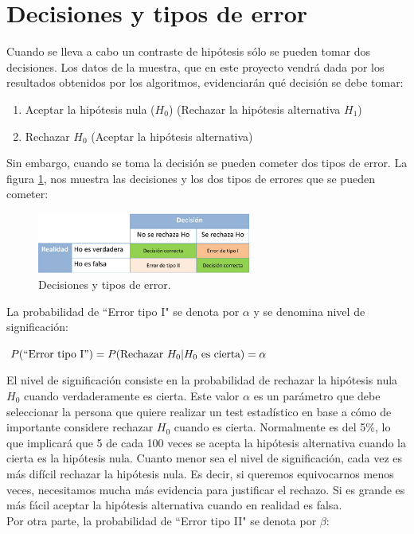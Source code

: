 \section{Decisiones y tipos de error} \label{tipos_error}
Cuando se lleva a cabo un contraste de hipótesis sólo se pueden tomar dos decisiones. Los datos de la muestra,
que en este proyecto vendrá dada por los resultados obtenidos por los algoritmos, evidenciarán qué decisión se
debe tomar:
\begin{enumerate}
\item Aceptar la hipótesis nula ($H_0$) (Rechazar la hipótesis alternativa $H_1$)
\item Rechazar $H_0$ (Aceptar la hipótesis alternativa)
\end{enumerate}
Sin embargo, cuando se toma la decisión se pueden cometer dos tipos de error. La figura \ref{fig:decision}, nos
muestra las decisiones y los dos tipos de errores que se pueden cometer:
\begin{figure}[h]
\centering
\includegraphics[width=7cm,height=2cm]{figuras/tipos_error.png}
\caption{Decisiones y tipos de error.}
\label{fig:decision}
\end{figure}
\newpage
La probabilidad de ``Error tipo I" se denota por $\alpha$ y se denomina nivel de significación:
\begin{center}
$P(\mbox{``Error tipo I}") = P(\mbox{Rechazar } H_0|H_0 \mbox{ es cierta}) =\alpha$
\end{center}
El nivel de significación consiste en la probabilidad de rechazar la hipótesis nula $H_0$ cuando verdaderamente
es cierta. Este valor $\alpha$ es un parámetro que debe seleccionar la persona que quiere realizar un test
estadístico en base a cómo de importante considere rechazar $H_0$ cuando es cierta. Normalmente es del 5\%, lo
que implicará que 5 de cada 100 veces se acepta la hipótesis alternativa cuando la cierta es la hipótesis nula.
Cuanto menor sea el nivel de significación, cada vez es más difícil rechazar la hipótesis nula. Es decir, si
queremos equivocarnos menos veces, necesitamos mucha más evidencia para justificar el rechazo. Si es grande es
más fácil aceptar la hipótesis alternativa cuando en realidad es falsa.
\\Por otra parte, la probabilidad de ``Error tipo II" se denota por $\beta$:
